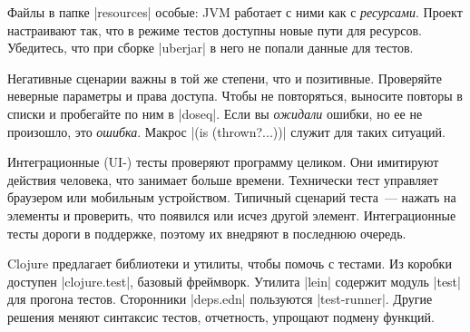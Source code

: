 Файлы в папке \spverb|resources| особые: JVM работает с ними как с
\emph{ресурсами}. Проект настраивают так, что в режиме тестов доступны новые
пути для ресурсов. Убедитесь, что при сборке \spverb|uberjar| в него не попали
данные для тестов.

Негативные сценарии важны в той же степени, что и позитивные. Проверяйте
неверные параметры и права доступа. Чтобы не повторяться, выносите повторы в
списки и пробегайте по ним в \spverb|doseq|.  Если вы \emph{ожидали} ошибки, но
ее не произошло, это \emph{ошибка}. Макрос \spverb|(is (thrown?...))| служит для
таких ситуаций.

Интеграционные (UI-) тесты проверяют программу целиком. Они имитируют действия
человека, что занимает больше времени. Технически тест управляет браузером или
мобильным устройством. Типичный сценарий теста~--- нажать на элементы и
проверить, что появился или исчез другой элемент. Интеграционные тесты дороги в
поддержке, поэтому их внедряют в последнюю очередь.

Clojure предлагает библиотеки и утилиты, чтобы помочь с тестами. Из коробки
доступен \spverb|clojure.test|, базовый фреймворк. Утилита \spverb|lein|
содержит модуль \spverb|test| для прогона тестов. Сторонники \spverb|deps.edn|
пользуются \spverb|test-runner|. Другие решения меняют синтаксис тестов,
отчетность, упрощают подмену функций.
